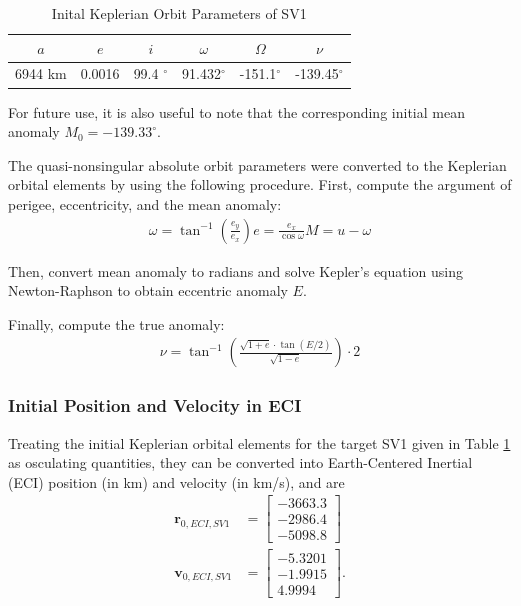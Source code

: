 \begin{table}[h]
\centering
\begin{tabular}{cccccc} \hline
    $a$ & $e$ & $i$ & $\omega$ & $\Omega$ & $\nu$ \\ \hline 
     6944 km & 0.0016 & 99.4 $^\circ$ & 91.432$^\circ$ & -151.1$^\circ$ & -139.45$^\circ$ \\ \hline
\end{tabular}
\caption{Inital Keplerian Orbit Parameters of SV1}
\label{tab:abs_oe_kepler}
\end{table}

For future use, it is also useful to note that the corresponding initial mean anomaly $M_0= -139.33^\circ$.

The quasi-nonsingular absolute orbit parameters were converted to the Keplerian orbital elements by using the following procedure. First, compute the argument of perigee, eccentricity, and the mean anomaly:
\begin{align}
\omega = \tan^{-1} \left( \frac{e_y}{e_x} \right)
e = \frac{e_x}{\cos \omega}
M = u - \omega
\end{align}

Then, convert mean anomaly to radians and solve Kepler's equation using Newton-Raphson to obtain eccentric anomaly \( E \).

Finally, compute the true anomaly:
\begin{align}
\nu = \tan^{-1} \left( \frac{\sqrt{1 + e} \cdot \tan(E/2)}{\sqrt{1 - e}} \right) \cdot 2
\end{align}

\subsubsection{Initial Position and Velocity in ECI}\label{sec:initial_ECI}
 Treating the initial Keplerian orbital elements for the target SV1 given in Table \ref{tab:abs_oe_kepler} as osculating quantities, they can be converted into Earth-Centered Inertial (ECI) position (in km) and velocity (in km/s), and are 
 \begin{align} \label{eq:SV1_initial_ECI}
     \boldsymbol{r}_{0, ECI, SV1} &= \begin{bmatrix}
         -3663.3 \\
         -2986.4 \\
         -5098.8
     \end{bmatrix} \\
     \boldsymbol{v}_{0, ECI, SV1} &= \begin{bmatrix}
         -5.3201 \\
         -1.9915 \\
         4.9994
     \end{bmatrix}.
 \end{align}


